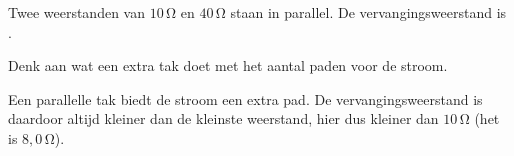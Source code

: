 \documentclass{ximera}
\begin{document}
\begin{question}
    Twee weerstanden van $10\,\mathrm{\Omega}$ en $40\,\mathrm{\Omega}$ staan in parallel. De vervangingsweerstand is .

    \begin{hint}
        Denk aan wat een extra tak doet met het aantal paden voor de stroom.
    \end{hint}

    \begin{solution}\nl
        Een parallelle tak biedt de stroom een extra pad. De vervangingsweerstand is daardoor altijd kleiner dan de kleinste weerstand, hier dus kleiner dan $10\,\mathrm{\Omega}$ (het is $8{,}0\,\mathrm{\Omega}$).
    \end{solution}
\end{question}
\end{document}
